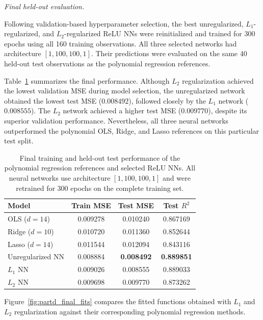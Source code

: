 \documentclass[aps,rmp,reprint,amsmath,amssymb,graphicx,longbibliography]{revtex4-1}
\begin{document}
\noindent\textit{Final held-out evaluation.}

Following validation-based hyperparameter selection,
the best unregularized, $L_1$-regularized, and
$L_2$-regularized ReLU NNs were reinitialized
and trained for 300 epochs using all 160 training
observations. All three selected networks had
architecture $[1,100,100,1]$. Their predictions
were evaluated on the same 40 held-out test
observations as the polynomial regression references.

Table~\ref{tab:partd_final_comparison} summarizes the
final performance. Although $L_2$ regularization
achieved the lowest validation MSE during model
selection, the unregularized network obtained the
lowest test MSE ($0.008492$), followed closely by the
$L_1$ network ($0.008555$). The $L_2$ network
achieved a higher test MSE ($0.009770$), despite
its superior validation performance. Nevertheless,
all three neural networks outperformed the
polynomial OLS, Ridge, and Lasso references on
this particular test split.

\begin{table}[t]
\centering
\caption{Final training and held-out test performance
of the polynomial regression references and selected
ReLU NNs. All neural networks use
architecture $[1,100,100,1]$ and were retrained
for 300 epochs on the complete training set.}
\label{tab:partd_final_comparison}
\begin{ruledtabular}
\begin{tabular}{lccc}
Model & Train MSE & Test MSE & Test $R^2$ \\
\hline
OLS ($d=14$)       & 0.009278 & 0.010240 & 0.867169 \\
Ridge ($d=10$)     & 0.010720 & 0.011360 & 0.852644 \\
Lasso ($d=14$)     & 0.011544 & 0.012094 & 0.843116 \\
Unregularized NN   & 0.008884 & \textbf{0.008492} & \textbf{0.889851} \\
$L_1$ NN           & 0.009026 & 0.008555 & 0.889033 \\
$L_2$ NN           & 0.009698 & 0.009770 & 0.873262 \\
\end{tabular}
\end{ruledtabular}
\end{table}

Figure~\ref{fig:partd_final_fits} compares the fitted
functions obtained with $L_1$ and $L_2$
regularization against their corresponding
polynomial regression methods.
\end{document}
